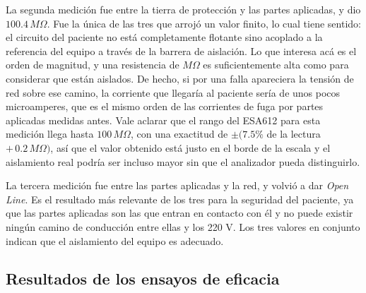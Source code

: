 La segunda medición fue entre la tierra de protección y las partes aplicadas, y dio $100.4 \,M\Omega$. Fue la única de las tres que arrojó un valor finito, lo cual tiene sentido: el circuito del paciente no está completamente flotante sino acoplado a la referencia del equipo a través
    de la barrera de aislación. Lo que interesa acá es el orden de magnitud, y una resistencia de $M\Omega$ es suficientemente alta como para considerar que están aislados. De hecho, si por una falla apareciera la tensión de red sobre ese camino, la corriente que llegaría al paciente
    sería de unos pocos microamperes, que es el mismo orden de las corrientes de fuga por partes aplicadas medidas antes. Vale aclarar que el rango del ESA612 para esta medición llega hasta $100 \,M\Omega$, con una exactitud de $\pm(7.5\%$ de la lectura $+ \,0.2 \,M\Omega)$, así que
    el valor obtenido está justo en el borde de la escala y el aislamiento real podría ser incluso mayor sin que el analizador pueda distinguirlo.

La tercera medición fue entre las partes aplicadas y la red, y volvió a dar \textit{Open Line}. Es el resultado más relevante de los tres para la seguridad del paciente, ya que las partes aplicadas son las que entran en contacto con él y no puede existir ningún camino de conducción
    entre ellas y los 220 V. Los tres valores en conjunto indican que el aislamiento del equipo es adecuado.

\subsection{Resultados de los ensayos de eficacia}